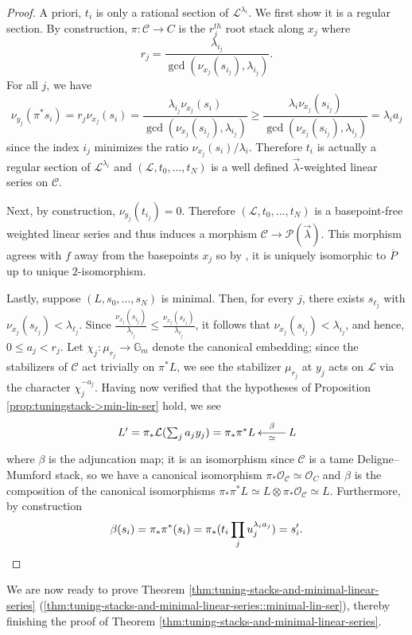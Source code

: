 \documentclass[a4paper,12pt]{amsart}
\theoremstyle{definition}
\newcommand{\bG}{\mathbb{G}}
\newcommand{\cO}{\mathcal{O}}
\newcommand{\cC}{\mathcal{C}}
\begin{document}
	\begin{proof} A priori, $t_i$ is only a rational section of $\mathcal{L}^{\lambda_i}$. We first show it is a regular section. By construction, $\pi \colon \mathcal{C} \to C$ is the $r_j^{th}$ root stack along $x_j$ where
		$$
		r_j = \frac{\lambda_{i_j}}{\gcd(\nu_{x_j}(s_{i_j}),\lambda_{i_j})}. 
		$$
		For all $j$, we have 
		$$
		\nu_{y_j}(\pi^*s_i) = r_j\nu_{x_j}(s_i) = \frac{\lambda_{i_j} \nu_{x_j}(s_i)}{\gcd(\nu_{x_j}(s_{i_j}), \lambda_{i_j})} \geq \frac{\lambda_i \nu_{x_j}(s_{i_j})}{\gcd(\nu_{x_j}(s_{i_j}), \lambda_{i_j})} = \lambda_i a_j
		$$
		since the index $i_j$ minimizes the ratio  $\nu_{x_j}(s_i)/\lambda_i$. Therefore $t_i$ is actually a regular section of $\mathcal{L}^{\lambda_i}$ and $(\mathcal{L}, t_0, \ldots, t_N)$ is a well defined $\vec{\lambda}$-weighted linear series on $\mathcal{C}$.
		
		Next, by construction, $\nu_{y_j}(t_{i_j}) = 0$. Therefore $(\mathcal{L},t_0,\dots,t_N)$ is a basepoint-free weighted linear series and thus induces a morphism $\mathcal{C} \to \mathcal{P}(\vec{\lambda})$. This morphism agrees with $f$ away from the basepoints $x_j$ so by \cite[Prop. 1.2]{FMN}, it is uniquely isomorphic to $\overline{P}$ up to unique $2$-isomorphism.
		
		
		Lastly, suppose $(L,s_0,\dots,s_N)$ is minimal. Then, for every $j$, there exists $s_{\ell_j}$ with $\nu_{x_j}(s_{\ell_j})<\lambda_{\ell_j}$. Since $\frac{\nu_{x_j}(s_{i_j})}{\lambda_{i_j}}\leq \frac{\nu_{x_j}(s_{\ell_j})}{\lambda_{\ell_j}}$, it follows that $\nu_{x_j}(s_{i_j})<\lambda_{i_j}$, and hence, $0\leq a_j<r_j$. Let $\chi_j\colon\mu_{r_j}\to\bG_m$ denote the canonical embedding; since the stabilizers of $\cC$ act trivially on $\pi^*L$, we see the stabilizer $\mu_{r_j}$ at $y_j$ acts on $\mathcal{L}$ via the character $\chi_j^{-a_j}$. Having now verified that the hypotheses of Proposition \ref{prop:tuningstack->min-lin-ser} hold, we see 
		\[
		\xymatrix{
			L'=\pi_*\mathcal{L}(\sum_ja_jy_j)=\pi_*\pi^*L & L\ar[l]_-{\beta}^-{\simeq}
		}
		\]
		where $\beta$ is the adjuncation map; it is an isomorphism since $\cC$ is a tame Deligne--Mumford stack, so we have a canonical isomorphism $\pi_*\cO_\cC\simeq\cO_C$ and $\beta$ is the composition of the canonical isomorphisms $\pi_*\pi^*L\simeq L\otimes\pi_*\cO_\cC\simeq L$. Furthermore, by construction 
		\[
		\beta(s_i)=\pi_*\pi^*(s_i)=\pi_*(t_i\prod_ju_j^{\lambda_ia_j})=s'_i.\qedhere
		\]
	\end{proof} 
	
	
	We are now ready to prove Theorem \ref{thm:tuning-stacks-and-minimal-linear-series} (\ref{thm:tuning-stacks-and-minimal-linear-series::minimal-lin-ser}), thereby finishing the proof of Theorem \ref{thm:tuning-stacks-and-minimal-linear-series}.
	
\end{document}
